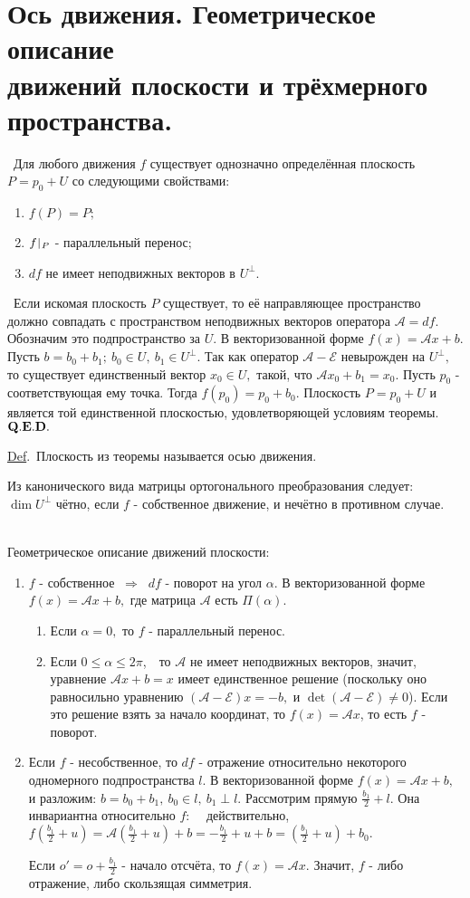 \documentclass[draft]{article}%
\newcommand{\de}{\par\noindent\underline{Def}.\ }%
\newcommand{\ab}{\par\noindent}%
\newcommand{\te}{\par\noindent{\bf Теорема.}\ }%
\newcommand{\dok}{\par\noindent{\textsl{Доказательство}.}\ }%
\newcommand{\qed}{\quad${{\bf Q.E.D.}}$}
\newcommand{\om}[1]{\mathcal{#1}}
\renewcommand{\le}{\leqslant}
\begin{document}
\section{Ось движения. Геометрическое описание\\ движений плоскости и трёхмерного пространства.}
\label{q48}
\te Для любого движения $f$ существует однозначно определённая плоскость $P=p_0+U$ со следующими свойствами:
\begin{enumerate}
    \item $f(P)=P;$
    \item $f\,\vrule\,_P$ - параллельный перенос;
    \item $df$ не имеет неподвижных векторов в $U^\bot.$
\end{enumerate}
\dok Если искомая плоскость $P$ существует, то её направляющее пространство должно совпадать с пространством
неподвижных векторов оператора $\om{A}=df.$ Обозначим это подпространство за $U$. В векторизованной форме $f(x)=\om{A}x+b.$
Пусть $b=b_0+b_1;\ b_0\in U,\ b_1\in U^\bot.$ Так как оператор $\om{A-E}$ невырожден на $U^\bot,$ то существует единственный
вектор $x_0\in U,$ такой, что $\om{A}x_0+b_1=x_0.$ Пусть $p_0$ - соответствующая ему точка. Тогда $f(p_0)=p_0+b_0.$ Плоскость
$P=p_0+U$ и является той единственной плоскостью, удовлетворяющей условиям теоремы.\qed
\de Плоскость из теоремы называется осью движения.
\ab Из канонического вида матрицы ортогонального преобразования следует:\\ $\dim U^\bot$ чётно, если $f$ - собственное
движение, и нечётно в противном случае.
\ab\\ Геометрическое описание движений плоскости:
\begin{enumerate}
    \item $f$ - собственное $\ \Rightarrow\ $ $df$ - поворот на угол $\alpha.$ В векторизованной форме $f(x)=\om{A}x+b,$ где
    матрица $\om{A}$ есть $\Pi(\alpha).$
    \begin{enumerate}
        \item Если $\alpha=0,$ то $f$ - параллельный перенос.
        \item Если $0\le \alpha\le 2\pi$,\ \ то $\om{A}$ не имеет неподвижных векторов, значит, уравнение $\om{A}x+b=x$
    имеет единственное решение (поскольку оно равносильно уравнению $(\om{A-E})x=-b,$ и $\det(\om{A-E})\ne 0$). Если это
    решение взять за начало координат, то $f(x)=\om{A}x$, то есть $f$ - поворот.
    \end{enumerate}
    \item Если $f$ - несобственное, то $df$ - отражение относительно некоторого одномерного подпространства $l$. В векторизованной форме
    $f(x)=\om{A}x+b,$ и разложим: $b=b_0+b_1,\ b_0\in l,\ b_1\perp l.$ Рассмотрим прямую $\frac{b_1}{2}+l.$ Она инвариантна относительно $f$:
    \ \ действительно, \\
    $f(\frac{b_1}2+u)=\om{A}(\frac{b_1}2+u)+b=-\frac{b_1}2+u+b=(\frac{b_1}2+u)+b_0.$
    \ab Если $o'=o+\frac{b_1}2$ - начало отсчёта, то $f(x)=\om{A}x.$ Значит, $f$ - либо отражение, либо скользящая симметрия.
\end{enumerate}
\end{document}
